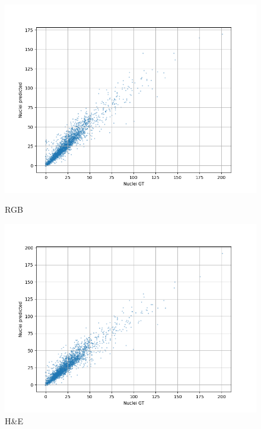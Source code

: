 \documentclass[target=bach,aauheader=,style=]{thud}
\begin{document}
\begin{figure}[ht]
\centering

\begin{minipage}{0.45\textwidth}
    \centering
    \includegraphics[width=\linewidth]{imgs/Diffusion_graphics_RGB.png}
    \caption*{RGB} %
\end{minipage}
\hspace{0.5cm}
\begin{minipage}{0.45\textwidth}
    \centering
    \includegraphics[width=\linewidth]{imgs/grafo_diffusione_HE.png}
    \caption*{H\&E}
\end{minipage}

\vspace{0.5cm}


\end{figure}
\end{document}
